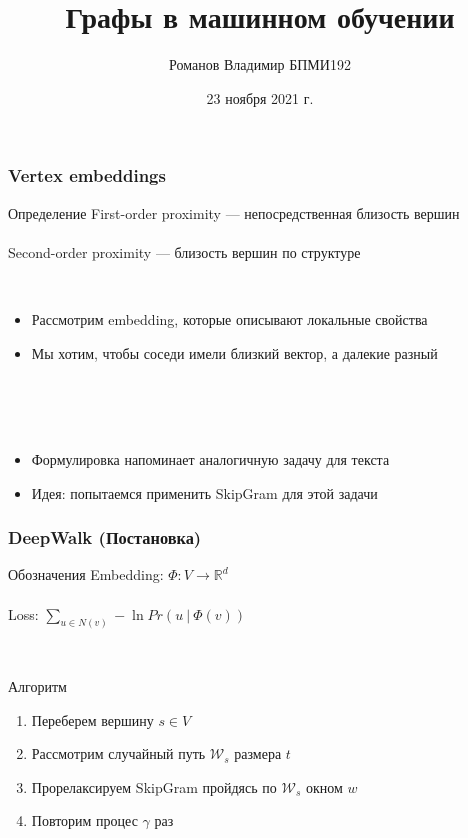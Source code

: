 \documentclass{beamer}
\title{Графы в машинном обучении}
\author[Романов Владимир]{Романов Владимир БПМИ192}
\institute[ВШЭ]{Национальный исследовательский университет \\ «Высшая школа экономики» (Москва)}
\date{23 ноября 2021 г.}
\newcommand{\R}{\mathbb{R}}
\newcommand{\skipline}[0]{$ $\\}
\begin{document}
\frame{\titlepage}





\begin{frame}
    \frametitle{Vertex embeddings}
    \begin{block}{Определение}
        First-order proximity --- непосредственная близость вершин 
        \skipline
        \skipline
        Second-order proximity --- близость вершин по структуре
    \end{block}
    \skipline
    \begin{itemize}
        \item Рассмотрим embedding, которые описывают локальные свойства
        \item Мы хотим, чтобы соседи имели близкий вектор, а далекие разный
    \end{itemize}
    \skipline
    \skipline
    \skipline
    \begin{itemize}
        \item Формулировка напоминает аналогичную задачу для текста
        \item Идея: попытаемся применить SkipGram для этой задачи
    \end{itemize}
\end{frame}

\begin{frame}
    \frametitle{DeepWalk (Постановка)}

    \begin{block}{Обозначения}
        Embedding: $\varPhi: V \to \R^d$ 
        \skipline
        \skipline
        Loss: $\sum_{u \in N(v)} -\ln Pr\left(u \ \vert\ \varPhi(v)\right)$
    \end{block}
    \skipline
    \begin{block}{Алгоритм}
        \begin{enumerate}
            \item Переберем вершину $s \in V$
            \item Рассмотрим случайный путь $\mathcal{W}_s$ размера $t$
            \item Прорелаксируем SkipGram пройдясь по $\mathcal{W}_s$ окном $w$
            \item Повторим процес $\gamma$ раз
        \end{enumerate}
    \end{block}
\end{frame}
\end{document}
